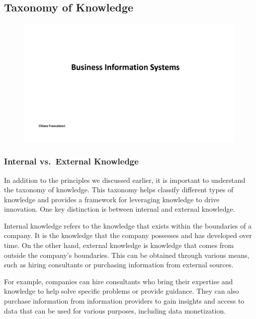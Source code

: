 \subsection{Taxonomy of Knowledge}\label{taxonomy-of-knowledge}

\begin{figure}[!h]
  \centering
  \includegraphics[page=5, trim = 1.5cm 1cm 1.5cm 3cm, clip, width=\imagewidth]{images/05 - KM.pdf}
\end{figure}

\subsubsection{Internal vs.~External
  Knowledge}\label{internal-vs.-external-knowledge}

In addition to the principles we discussed earlier, it is important to
understand the taxonomy of knowledge. This taxonomy helps classify
different types of knowledge and provides a framework for leveraging
knowledge to drive innovation. One key distinction is between internal
and external knowledge.

Internal knowledge refers to the knowledge that exists within the
boundaries of a company. It is the knowledge that the company possesses
and has developed over time. On the other hand, external knowledge is
knowledge that comes from outside the company's boundaries. This can be
obtained through various means, such as hiring consultants or purchasing
information from external sources.

For example, companies can hire consultants who bring their expertise
and knowledge to help solve specific problems or provide guidance. They
can also purchase information from information providers to gain
insights and access to data that can be used for various purposes,
including data monetization.

